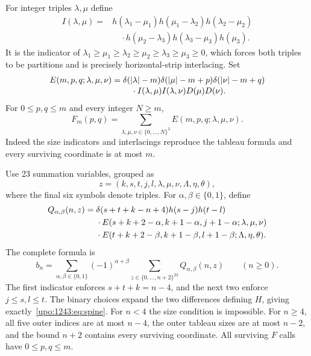 \documentclass[11pt,letterpaper]{article}
\theoremstyle{remark}\newtheorem{remark}[theorem]{Remark}
\numberwithin{equation}{section}
\begin{document}
For integer triples $\lambda,\mu$ define
\begin{align*}
 I(\lambda,\mu)={}&h(\lambda_1-\mu_1)h(\mu_1-\lambda_2)
 h(\lambda_2-\mu_2)\\
 &\quad\cdot h(\mu_2-\lambda_3)h(\lambda_3-\mu_3)h(\mu_3).
\end{align*}
It is the indicator of
$\lambda_1\ge\mu_1\ge\lambda_2\ge\mu_2\ge\lambda_3\ge\mu_3\ge0$,
which forces both triples to be partitions and is precisely
horizontal-strip interlacing. Set
\begin{align}
 E(m,p,q;\lambda,\mu,\nu)={}&
 \delta(|\lambda|-m)\delta(|\mu|-m+p)\delta(|\nu|-m+q)
 \notag\\[-2pt]
 &\quad\cdot I(\lambda,\mu)I(\lambda,\nu)D(\mu)D(\nu).
 \label{upo:1243:eq:E}
\end{align}
For $0\le p,q\le m$ and every integer $N\ge m$,
\begin{equation}\label{upo:1243:eq:boxF}
 F_m(p,q)=\sum_{\lambda,\mu,\nu\in\{0,\ldots,N\}^3}
 E(m,p,q;\lambda,\mu,\nu).
\end{equation}
Indeed the size indicators and interlacings reproduce the tableau
formula and every surviving coordinate is at most $m$.

Use 23 summation variables, grouped as
\[
 z=(k,s,t,j,l,\lambda,\mu,\nu,\Lambda,\eta,\theta),
\]
where the final six symbols denote triples. For
$\alpha,\beta\in\{0,1\}$, define
\begin{align}
 Q_{\alpha,\beta}(n,z)={}&
 \delta(s+t+k-n+4)h(s-j)h(t-l)\notag\\
 &\cdot E(s+k+2-\alpha,k+1-\alpha,j+1-\alpha;
                  \lambda,\mu,\nu)\notag\\
 &\cdot E(t+k+2-\beta,k+1-\beta,l+1-\beta;
                  \Lambda,\eta,\theta).\label{upo:1243:eq:Q}
\end{align}
The complete formula is
\begin{equation}\label{upo:1243:eq:master}
 b_n=\sum_{\alpha,\beta\in\{0,1\}}(-1)^{\alpha+\beta}
 \sum_{z\in\{0,\ldots,n+2\}^{23}}Q_{\alpha,\beta}(n,z)
 \qquad(n\ge0).
\end{equation}
The first indicator enforces $s+t+k=n-4$, and the next two enforce
$j\le s,l\le t$. The binary choices expand the two differences defining
$H$, giving exactly~\eqref{upo:1243:eq:spine}. For $n<4$ the size condition is
impossible. For $n\ge4$, all five outer indices are at most $n-4$, the
outer tableau sizes are at most $n-2$, and the bound $n+2$ contains every
surviving coordinate. All surviving $F$ calls have $0\le p,q\le m$.
\end{document}
